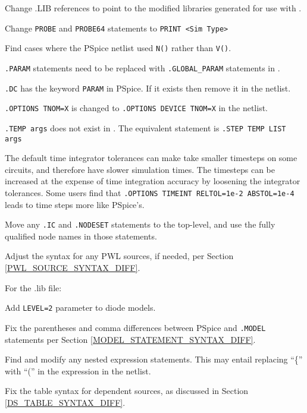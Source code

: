 \begin{XyceItemize}
\item Change .LIB references to point to the modified libraries generated
   for use with \Xyce{}.
\item Change \texttt{PROBE} and \texttt{PROBE64} statements to \texttt{PRINT <Sim Type>}
\item Find cases where the PSpice netlist used \texttt{N()} rather
   than \texttt{V()}.
\item \texttt{.PARAM} statements need to be replaced with 
   \texttt{.GLOBAL\_PARAM} statements in \Xyce{}.
\item \texttt{.DC} has the keyword \texttt{PARAM} in PSpice.  If it
   exists then remove it in the \Xyce{} netlist.
\item \texttt{.OPTIONS TNOM=X} is changed to \texttt{.OPTIONS
   DEVICE TNOM=X} in the \Xyce{} netlist.
\item \texttt{.TEMP args} does not exist in \Xyce{}.  The equivalent
   \Xyce{} statement is \texttt{.STEP TEMP LIST args}
\item The default time integrator tolerances can make \Xyce{} take
   smaller timesteps on some circuits, and therefore have slower
   simulation times.  The \Xyce{} timesteps can be increased at the
   expense of time integration accuracy by loosening the
   integrator tolerances.  Some users find that  \texttt{.OPTIONS 
   TIMEINT RELTOL=1e-2 ABSTOL=1e-4} leads to time steps more like PSpice's.
\item Move any \texttt{.IC} and \texttt{.NODESET} statements to the top-level,
   and use the fully qualified node names in those statements.
\item Adjust the syntax for any PWL sources, if needed, per 
   Section \ref{PWL_SOURCE_SYNTAX_DIFF}.
\end{XyceItemize}

For the .lib file:
\begin{XyceItemize}
\item Add \texttt{LEVEL=2} parameter to diode models.
\item Fix the parentheses and comma differences between PSpice and 
   \Xyce \texttt{.MODEL} statements per Section \ref{MODEL_STATEMENT_SYNTAX_DIFF}.
\item Find and modify any nested expression statements.  This may 
   entail replacing ``\{'' with ``('' in the expression in the \Xyce{} netlist.
\item Fix the table syntax for dependent sources, as discussed in
Section \ref{DS_TABLE_SYNTAX_DIFF}.

\end{XyceItemize}

